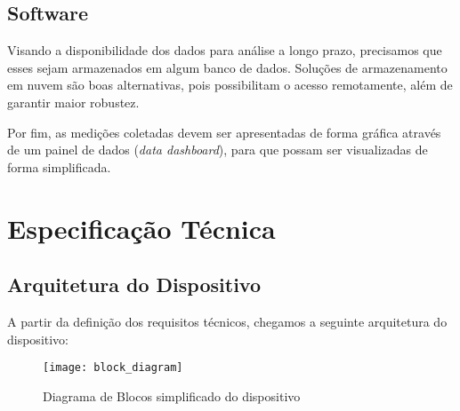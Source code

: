 \documentclass[../monografia.tex]{subfiles}
\begin{document}
\subsection{Software}

Visando a disponibilidade dos dados para análise a longo prazo, precisamos que esses sejam armazenados em algum banco de dados. Soluções de armazenamento em nuvem são boas alternativas, pois possibilitam o acesso remotamente, além de garantir maior robustez.

Por fim, as medições coletadas devem ser apresentadas de forma gráfica através de um painel de dados (\textit{data dashboard}), para que possam ser visualizadas de forma simplificada. 

\section{Especificação Técnica}%

\subsection{Arquitetura do Dispositivo} 
A partir da definição dos requisitos técnicos, chegamos a seguinte arquitetura do dispositivo:

\begin{figure}[h]
    \centering
    \texttt{[image: block\_diagram]}
    \caption{Diagrama de Blocos simplificado do dispositivo}
    \label{fig:Diagrama de Blocos}
\end{figure}
\end{document}
